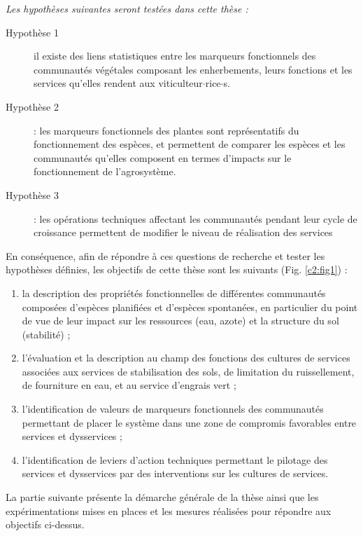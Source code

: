 \medskip

\noindent \textit{Les hypothèses suivantes seront testées dans cette thèse :}

\begin{description}
\item[Hypothèse 1]\label{c1:h} il existe des liens statistiques entre les marqueurs fonctionnels des communautés végétales composant les enherbements, leurs fonctions et les services qu'elles rendent aux viticulteur$\cdot$rice$\cdot$s.
\item[Hypothèse 2] : les marqueurs fonctionnels des plantes sont représentatifs du fonctionnement des espèces, et permettent de comparer les espèces et les communautés qu'elles composent en termes d'impacts sur le fonctionnement de l'agrosystème.
\item[Hypothèse 3] : les opérations techniques affectant les communautés pendant leur cycle de croissance permettent de modifier le niveau de réalisation des services 

\end{description}

En conséquence, afin de répondre à ces questions de recherche et tester les hypothèses définies, les objectifs de cette thèse sont les suivants (Fig. \ref{c2:fig1}) :
\begin{enumerate}
\item la description des propriétés fonctionnelles de différentes communautés composées d'espèces planifiées et d'espèces spontanées, en particulier du point de vue de leur impact sur les ressources (eau, azote) et la structure du sol (stabilité) ;
\item l'évaluation et la description au champ des fonctions des cultures de services associées aux services de stabilisation des sols, de limitation du ruissellement, de fourniture en eau, et au service d'engrais vert ;
\item l'identification de valeurs de marqueurs fonctionnels des communautés permettant de placer le système dans une zone de compromis favorables entre services et dysservices ;
\item l'identification de leviers d'action techniques permettant le pilotage des services et dysservices par des interventions sur les cultures de services.
\end{enumerate}

La partie suivante présente la démarche générale de la thèse ainsi que les expérimentations mises en places et les mesures réalisées pour répondre aux objectifs ci-dessus.
